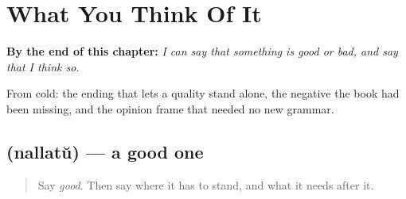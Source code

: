 
\chapter{What You Think Of It}
\label{ch:ml-opinion}

\begin{chapteropening}
\textbf{By the end of this chapter:} \emph{I can say that something is good or bad, and say that I think so.}

From cold: the ending that lets a quality stand alone, the negative the book had been missing, and the opinion frame that needed no new grammar.
\end{chapteropening}

\section[\texorpdfstring{\ml{നല്ലത്} (nallatŭ)}{നല്ലത് (nallatŭ)}]{ (nallatŭ) — a good one}

\label{lesson:ML-C89-nallathu}



\begin{quote}
Say \emph{good}. Then say where it has to stand, and what it needs after it.
\end{quote}

